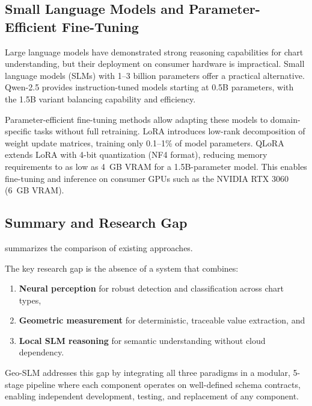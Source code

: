 \subsection{Small Language Models and Parameter-Efficient Fine-Tuning}

Large language models have demonstrated strong reasoning capabilities for chart
understanding, but their deployment on consumer hardware is impractical. Small language
models (SLMs) with 1--3 billion parameters offer a practical alternative. Qwen-2.5
\cite{yang2024qwen2} provides instruction-tuned models starting at 0.5B parameters,
with the 1.5B variant balancing capability and efficiency.

Parameter-efficient fine-tuning methods allow adapting these models to domain-specific
tasks without full retraining. LoRA \cite{hu2022lora} introduces low-rank decomposition
of weight update matrices, training only 0.1--1\% of model parameters. QLoRA
\cite{dettmers2024qlora} extends LoRA with 4-bit quantization (NF4 format), reducing
memory requirements to as low as 4~GB VRAM for a 1.5B-parameter model. This enables
fine-tuning and inference on consumer GPUs such as the NVIDIA RTX 3060 (6~GB VRAM).

\subsection{Summary and Research Gap}

 summarizes the comparison of existing approaches.

\begin{table}[htbp]
\centering
\caption{Comparison of existing chart understanding methods.}
\label{tab:related_work}

\end{table}

The key research gap is the absence of a system that combines:
\begin{enumerate}
    \item \textbf{Neural perception} for robust detection and classification across chart types,
    \item \textbf{Geometric measurement} for deterministic, traceable value extraction, and
    \item \textbf{Local SLM reasoning} for semantic understanding without cloud dependency.
\end{enumerate}

Geo-SLM addresses this gap by integrating all three paradigms in a modular, 5-stage
pipeline where each component operates on well-defined schema contracts, enabling
independent development, testing, and replacement of any component.

